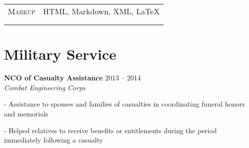 \documentclass[
	12pt,a4paper %
]{article}
\newcommand{\tableentry}[3]{
	\textsc{#1} & #2\expandafter\ifstrequal\expandafter{#3}{}{\\}{\\[5pt]} %
}
\begin{document}
\begin{paracol}{2}
\begin{supertabular}{r l}
	\tableentry{Markup}{HTML, Markdown, XML, \LaTeX}{spaceafter}
\end{supertabular}
\section{Military Service}
\textbf{NCO of Casualty Assistance} \hfill 2013 -- 2014 \\
\textit{Combat Engineering Corps}

- Assistance to spouses and families of casualties in coordinating funeral honors and memorials

- Helped relatives to receive benefits or entitlements during the period immediately following a casualty
\end{paracol} %
\end{document}
